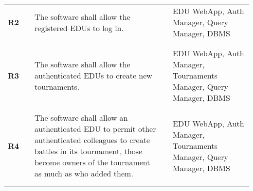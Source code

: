 \begin{longtable}[H]{l l p{6cm} l p{4cm}}
    \textbf{R2}             & \vline & The software shall allow the registered EDUs to log in.                                                                                                                                                                                                                      & \vline &  EDU WebApp, Auth Manager, Query Manager, DBMS                                           \\          
                            &        &                                                                                                                                                                                                                                                                              &        &                                                                                          \\\hline & & \\ 
    \textbf{R3}             & \vline & The software shall allow the authenticated EDUs to create new tournaments.                                                                                                                                                                                                   & \vline &  EDU WebApp, Auth Manager, Tournaments Manager, Query Manager, DBMS                      \\          
                            &        &                                                                                                                                                                                                                                                                              &        &                                                                                          \\\hline & & \\ 
    \textbf{R4}             & \vline & The software shall allow an authenticated EDU to permit other authenticated colleagues to create battles in its tournament, those become owners of the tournament as much as who added them.                                                                                 & \vline &  EDU WebApp, Auth Manager, Tournaments Manager, Query Manager, DBMS                      \\          
                            &        &                                                                                                                                                                                                                                                                              &        &                                                                                          \\\hline & & \\ 

\end{longtable}
